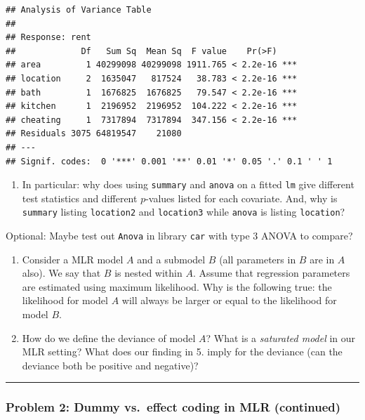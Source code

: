 \documentclass[
]{article}
\providecommand{\tightlist}{%
  \setlength{\itemsep}{0pt}\setlength{\parskip}{0pt}}
\begin{document}
\begin{verbatim}
## Analysis of Variance Table
## 
## Response: rent
##             Df   Sum Sq  Mean Sq  F value    Pr(>F)    
## area         1 40299098 40299098 1911.765 < 2.2e-16 ***
## location     2  1635047   817524   38.783 < 2.2e-16 ***
## bath         1  1676825  1676825   79.547 < 2.2e-16 ***
## kitchen      1  2196952  2196952  104.222 < 2.2e-16 ***
## cheating     1  7317894  7317894  347.156 < 2.2e-16 ***
## Residuals 3075 64819547    21080                       
## ---
## Signif. codes:  0 '***' 0.001 '**' 0.01 '*' 0.05 '.' 0.1 ' ' 1
\end{verbatim}

\begin{enumerate}
\def\labelenumi{\arabic{enumi}.}
\setcounter{enumi}{3}
\tightlist
\item
  In particular: why does using \texttt{summary} and \texttt{anova} on a
  fitted \texttt{lm} give different test statistics and different
  \(p\)-values listed for each covariate. And, why is \texttt{summary}
  listing \texttt{location2} and \texttt{location3} while \texttt{anova}
  is listing \texttt{location}?
\end{enumerate}

Optional: Maybe test out \texttt{Anova} in library \texttt{car} with
type 3 ANOVA to compare?

\begin{enumerate}
\def\labelenumi{\arabic{enumi}.}
\setcounter{enumi}{4}
\item
  Consider a MLR model \(A\) and a submodel \(B\) (all parameters in
  \(B\) are in \(A\) also). We say that \(B\) is nested within \(A\).
  Assume that regression parameters are estimated using maximum
  likelihood. Why is the following true: the likelihood for model \(A\)
  will always be larger or equal to the likelihood for model \(B\).
\item
  How do we define the deviance of model \(A\)? What is a
  \emph{saturated model} in our MLR setting? What does our finding in 5.
  imply for the deviance (can the deviance both be positive and
  negative)?
\end{enumerate}

\begin{center}\rule{0.5\linewidth}{0.5pt}\end{center}

\hypertarget{problem-2-dummy-vs.-effect-coding-in-mlr-continued}{%
\subsubsection{Problem 2: Dummy vs.~effect coding in MLR
(continued)}\label{problem-2-dummy-vs.-effect-coding-in-mlr-continued}}
\end{document}

